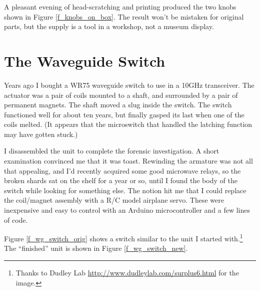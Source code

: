 \documentclass[12pt]{article}
\begin{document}
A pleasant evening of head-scratching and printing produced the two knobs
shown in Figure \ref{f_knobs_on_box}.  The result won't be mistaken for
original parts, but the supply is a tool in a workshop, not a museum display. 

\section{The Waveguide Switch}

Years ago I bought a WR75 waveguide switch to use in a 10GHz transceiver.
The actuator was a pair of coils mounted to a shaft, and surrounded by
a pair of permanent magnets.  The shaft moved a slug inside the switch.
The switch functioned well for about ten years, but finally gasped its last
when one of the coils melted. (It appears that the microswitch that
handled the latching function may have gotten stuck.)

I disassembled the unit to complete the forensic investigation.  A short
examination convinced me that it was toast.  Rewinding the armature was
not all that appealing, and I'd recently acquired some good microwave relays,
so the broken shards sat on the shelf for a year or so, until I found the body
of the switch while looking for something else. The notion hit me that I
could replace the coil/magnet assembly with a R/C model airplane servo.
These were inexpensive and easy to control with an Arduino microcontroller
and a few lines of code.

Figure \ref{f_wg_switch_orig} shows a switch similar to the unit I started
with.\footnote{Thanks to Dudley Lab \url{http://www.dudleylab.com/surplus6.html} for the image.}  
The ``finished'' unit is shown in Figure \ref{f_wg_switch_new}. 
\end{document}
